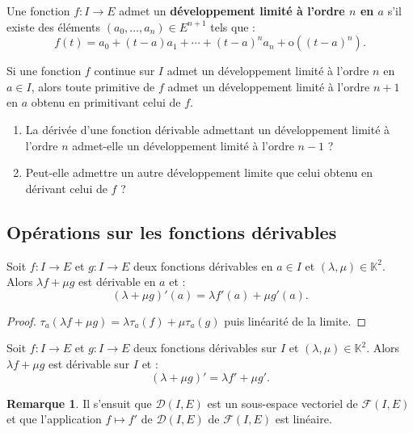 \documentclass[french]{article}
\newcommand{\K}{\mathbb{K}}
\renewcommand{\o}{\text{o}}
\theoremstyle{plain}
\theoremstyle{definition}
\newtheorem*{rmq}{Remarque}
\theoremstyle{remark}
\begin{document}
\begin{dfn}
	Une fonction $f:I\to E$ admet un \textbf{développement limité à l'ordre $n$ en $a$} s'il existe des éléments $(a_0,\ldots,a_n)\in E^{n+1}$ tels que :
	$$f(t)=a_0+(t-a)a_1+\cdots+(t-a)^na_n+\o((t-a)^n).$$
\end{dfn}

\begin{prop}%
	Si une fonction $f$ continue sur $I$ admet un développement limité à l'ordre $n$ en $a\in I$, alors toute primitive de $f$ admet un développement limité à l'ordre $n+1$ en $a$ obtenu en primitivant celui de $f$.
\end{prop}

\begin{exo}
	\begin{enumerate}
		\item La dérivée d'une fonction dérivable admettant un développement limité à l'ordre $n$ admet-elle un développement limité à l'ordre $n-1$ ? 
		\item Peut-elle admettre un autre développement limite que celui obtenu en dérivant celui de $f$ ?
	\end{enumerate}
\end{exo}

\subsection{Opérations sur les fonctions dérivables}

\begin{prop}%
	Soit $f:I\to E$ et $g:I\to E$ deux fonctions dérivables en $a\in I$ et $(\lambda,\mu)\in\K^2$. Alors $\lambda f+\mu g$ est dérivable en $a$ et :
	$$(\lambda+\mu g)'(a)=\lambda f'(a)+\mu g'(a).$$
\end{prop}
\begin{proof}
	$\tau_a(\lambda f+\mu g)=\lambda\tau_a(f)+\mu\tau_a(g)$ puis linéarité de la limite.
\end{proof}

\begin{cor}%
	Soit $f:I\to E$ et $g:I\to E$ deux fonctions dérivables sur $I$ et $(\lambda,\mu)\in\K^2$. Alors $\lambda f+\mu g$ est dérivable sur $I$ et :
	$$(\lambda+\mu g)'=\lambda f'+\mu g'.$$
\end{cor}

\begin{rmq}
	Il s'ensuit que $\mathcal{D}(I,E)$ est un sous-espace vectoriel de $\mathcal{F}(I,E)$ et que l'application $f\mapsto f'$ de $\mathcal{D}(I,E)$ de $\mathcal{F}(I,E)$ est linéaire.
\end{rmq}
\end{document}
